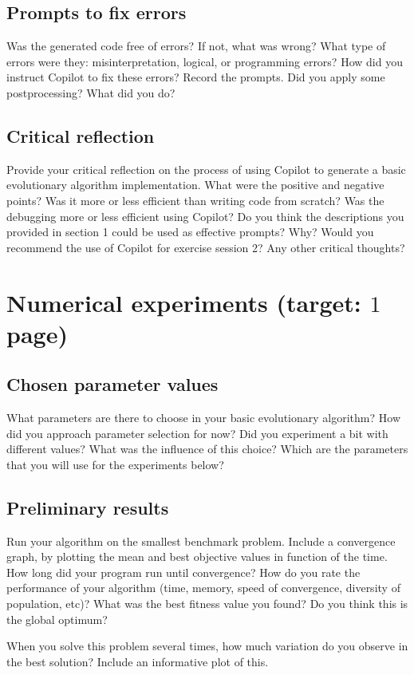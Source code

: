 \documentclass[a4paper,10pt]{article}
\newcommand{\ReplaceMe}[1]{{\color{blue}#1}}
\begin{document}
\subsection{Prompts to fix errors}
\ReplaceMe{Was the generated code free of errors? If not, what was wrong? What type of errors were they: misinterpretation, logical, or programming errors? How did you instruct Copilot to fix these errors? Record the prompts. Did you apply some postprocessing? What did you do?}

\subsection{Critical reflection}
\ReplaceMe{Provide your critical reflection on the process of using Copilot to generate a basic evolutionary algorithm implementation. What were the positive and negative points? Was it more or less efficient than writing code from scratch? Was the debugging more or less efficient using Copilot? Do you think the descriptions you provided in section 1 could be used as effective prompts? Why? Would you recommend the use of Copilot for exercise session 2? Any other critical thoughts?}


\section{Numerical experiments \hfill(target: $1$ page)}

\subsection{Chosen parameter values}

\ReplaceMe{What parameters are there to choose in your basic evolutionary algorithm? How did you approach parameter selection for now? Did you experiment a bit with different values? What was the influence of this choice? Which are the parameters that you will use for the experiments below?}

\subsection{Preliminary results}

\ReplaceMe{Run your algorithm on the smallest benchmark problem. Include a convergence graph, by plotting the mean and best objective values in function of the time. How long did your program run until convergence? How do you rate the performance of your algorithm (time, memory, speed of convergence, diversity of population, etc)? What was the best fitness value you found? Do you think this is the global optimum? 

When you solve this problem several times, how much variation do you observe in the best solution? Include an informative plot of this.}
\end{document}
